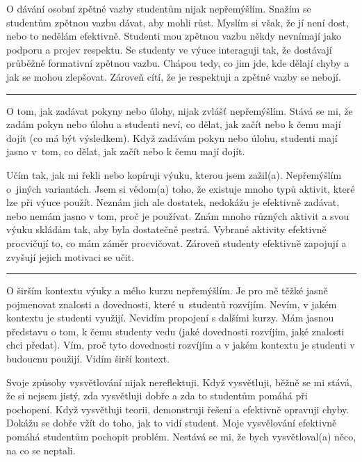 \newpage
{}
{O dávání osobní zpětné vazby studentům nijak nepřemýšlím.}
{Snažím se studentům zpětnou vazbu dávat, aby mohli růst. Myslím si však, že jí není dost, nebo to nedělám efektivně. Studenti mou zpětnou vazbu někdy nevnímají jako podporu a projev respektu.}
{Se studenty ve výuce interaguji tak, že dostávají průběžně formativní zpětnou vazbu. Chápou tedy, co jim jde, kde dělají chyby a jak se mohou zlepšovat. Zároveň cítí, že je respektuji a zpětné vazby se nebojí.}

\rule{\textwidth}{0.4pt}
{O tom, jak zadávat pokyny nebo úlohy, nijak zvlášť nepřemýšlím.}
{Stává se mi, že zadám pokyn nebo úlohu a studenti neví, co dělat, jak začít nebo k čemu mají dojít (co má být výsledkem).}
{Když zadávám pokyn nebo úlohu, studenti mají jasno v~tom, co dělat, jak začít nebo k čemu mají dojít.}

\newpage
{}
{Učím tak, jak mi řekli nebo kopíruji výuku, kterou jsem zažil(a). Nepřemýšlím o~jiných variantách.}
{Jsem si vědom(a) toho, že existuje mnoho typů aktivit, které lze při výuce použít. Neznám jich ale dostatek, nedokážu je efektivně zadávat, nebo nemám jasno v tom, proč je používat.}
{Znám mnoho různých aktivit a svou výuku skládám tak, aby byla dostatečně pestrá. Vybrané aktivity efektivně procvičují to, co mám záměr procvičovat. Zároveň studenty efektivně zapojují a zvyšují jejich motivaci se učit.}

\rule{\textwidth}{0.4pt}
{O širším kontextu výuky a mého kurzu nepřemýšlím.}
{Je pro mě těžké jasně pojmenovat znalosti a dovednosti, které u~studentů rozvíjím. Nevím, v jakém kontextu je studenti využijí. Nevidím propojení s dalšími kurzy.}
{Mám jasnou představu o tom, k čemu studenty vedu (jaké dovednosti rozvíjím, jaké znalosti chci předat). Vím, proč tyto dovednosti rozvíjím a v jakém kontextu je studenti v budoucnu použijí. Vidím širší kontext.}
\vspace*{-1em}

\newpage
{}
{Svoje způsoby vysvětlování nijak nereflektuji.}
{Když vysvětluji, běžně se mi stává, že si nejsem jistý, zda vysvětluji dobře a zda to studentům pomáhá při pochopení.}
{Když vysvětluji teorii, demonstruji řešení a efektivně opravuji chyby. Dokážu se dobře vžít do toho, jak to vidí student. Moje vysvělování efektivně pomáhá studentům pochopit problém. Nestává se mi, že bych vysvětloval(a) něco, na co se neptali.}

